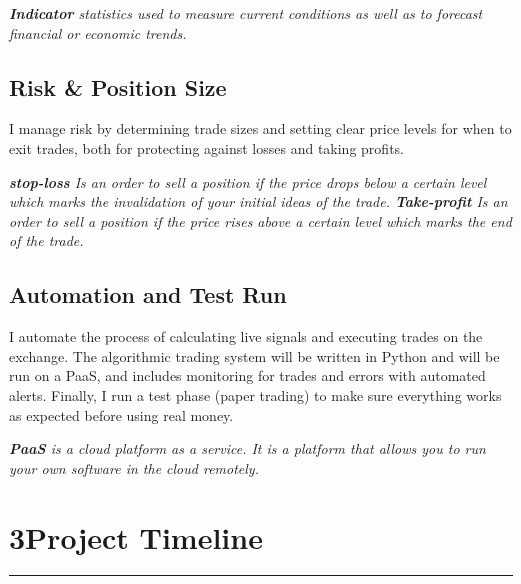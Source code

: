 \documentclass[12pt,a4paper]{article}
\begin{document}




\vspace{0.5em}
\noindent\textit{\footnotesize%
\textbf{Indicator} statistics used to measure current conditions as well as to forecast financial or economic trends.
}







\subsection{Risk \& Position Size}
I manage risk by determining trade sizes and setting clear price levels for when to exit trades, both for protecting against losses and taking profits. 

\vspace{0.5em}
\noindent\textit{\footnotesize%
\textbf{stop-loss} Is an order to sell a position if the price drops below a certain level which marks the invalidation of your initial ideas of the trade.
\textbf{Take-profit} Is an order to sell a position if the price rises above a certain level which marks the end of the trade.
}




\newpage

\subsection{Automation and Test Run}


I automate the process of calculating live signals and executing trades on the exchange. The algorithmic trading system will be written in Python and will be run on a PaaS, and includes monitoring for trades and errors with automated alerts. Finally, I run a test phase (paper trading) to make sure everything works as expected before using real money.

\vspace{0.5em}
\noindent\textit{\footnotesize%
\textbf{PaaS} is a cloud platform as a service. It is a platform that allows you to run your own software in the cloud remotely.}


\section*{3\hspace{1em}Project Timeline}
\vspace{-0.5em}
\noindent\rule{\textwidth}{0.5pt}
\end{document}
